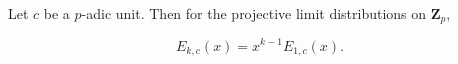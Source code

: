 Let $c$ be a $p$-adic unit. Then for the projective limit distributions on $\mathbf{Z}_p$,

$$E_{k,c}(x) = x^{k-1} E_{1,c}(x).$$
